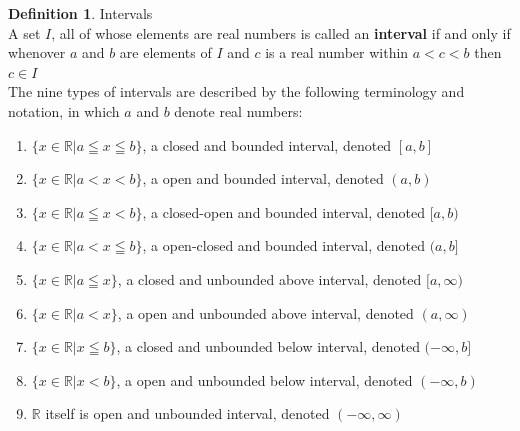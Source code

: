 \documentclass{book}
\theoremstyle{definition}
\newtheorem{definition}{Definition}[section]
\theoremstyle{remark}
\newcommand{\bb}[1]{\mathbb{#1}}
\begin{document}
\begin{definition}
Intervals \\

A set $I$, all of whose elements are real numbers is called an {\bf interval} if and only if whenover $a$ and $b$ are elements of $I$ and $c$ is a real number within $a<c<b$ then $c \in I$ \\

The nine types of intervals are described by the following terminology and notation, in which $a$ and $b$ denote real numbers: \\
\begin{tcolorbox}
    \begin{enumerate}
        \item $\{x \in \bb{R} | a \leqq x \leqq b \}$, a closed and bounded interval, denoted $[a,b]$ 
        
        \item $\{x \in \bb{R} | a < x < b \}$, a open and bounded interval, denoted $(a,b)$ 
        
        \item $\{x \in \bb{R} | a \leqq x < b \}$, a closed-open and bounded interval, denoted $[a,b)$ 
        
        \item $\{x \in \bb{R} | a < x \leqq b \}$, a open-closed and bounded interval, denoted $(a,b]$ 
        
        \item $\{x \in \bb{R} | a \leqq x \}$, a closed and unbounded above interval, denoted $[a, \infty)$ 
        
        \item $\{x \in \bb{R} | a < x \}$, a open and unbounded above interval, denoted $(a, \infty)$ 
        
        \item $\{x \in \bb{R} | x \leqq b \}$, a closed and unbounded below interval, denoted $(- \infty ,b]$ 
        
        \item $\{x \in \bb{R} | x < b \}$, a open and unbounded below interval, denoted $(- \infty ,b)$
        
        \item $\bb{R}$ itself is open and unbounded interval, denoted $(- \infty, \infty)$ \\
    \end{enumerate}
\end{tcolorbox}
\end{definition}
\end{document}
